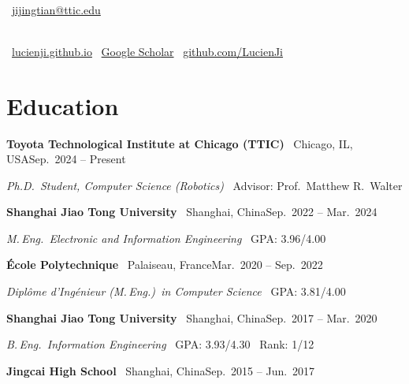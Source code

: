 \documentclass[10pt,letterpaper]{article}
\newcommand{\daterow}[2]{\noindent#1\hfill#2\par}
\newcommand{\cvsep}{\enspace\textbullet\enspace}
\newif\ifshowphone
\begin{document}
\begin{center}
  {\Huge\scshape{}}\\[5pt]
  \small
  \faEnvelope~\href{mailto:jijingtian@ttic.edu}{jijingtian@ttic.edu}%
  \ifshowphone \cvsep \faPhone~(+1)~XXX-XXX-XXXX\fi
  \\[3pt]
  \faGlobe~\href{https://lucienji.github.io}{lucienji.github.io}%
  \cvsep
  \faUserGraduate~\href{https://scholar.google.com/citations?user=DeQM4Z4AAAAJ&hl=en}{Google Scholar}%
  \cvsep
  \faGithub~\href{https://github.com/LucienJi}{github.com/LucienJi}
\end{center}

\section{Education}

\daterow{\textbf{Toyota Technological Institute at Chicago (TTIC)} \textbullet\ Chicago, IL, USA}{Sep.\ 2024 -- Present}
\textit{Ph.D.\ Student, Computer Science (Robotics)} \textbullet\ Advisor: Prof.\ Matthew R.\ Walter
\vspace{2pt}

\daterow{\textbf{Shanghai Jiao Tong University} \textbullet\ Shanghai, China}{Sep.\ 2022 -- Mar.\ 2024}
\textit{M.\,Eng.\ Electronic and Information Engineering} \textbullet\ GPA: 3.96/4.00
\vspace{2pt}

\daterow{\textbf{École Polytechnique} \textbullet\ Palaiseau, France}{Mar.\ 2020 -- Sep.\ 2022}
\textit{Diplôme d'Ingénieur (M.\,Eng.)\ in Computer Science} \textbullet\ GPA: 3.81/4.00
\vspace{2pt}

\daterow{\textbf{Shanghai Jiao Tong University} \textbullet\ Shanghai, China}{Sep.\ 2017 -- Mar.\ 2020}
\textit{B.\,Eng.\ Information Engineering} \textbullet\ GPA: 3.93/4.30 \textbullet\ Rank: 1/12
\vspace{2pt}

\daterow{\textbf{Jingcai High School} \textbullet\ Shanghai, China}{Sep.\ 2015 -- Jun.\ 2017}
\end{document}
